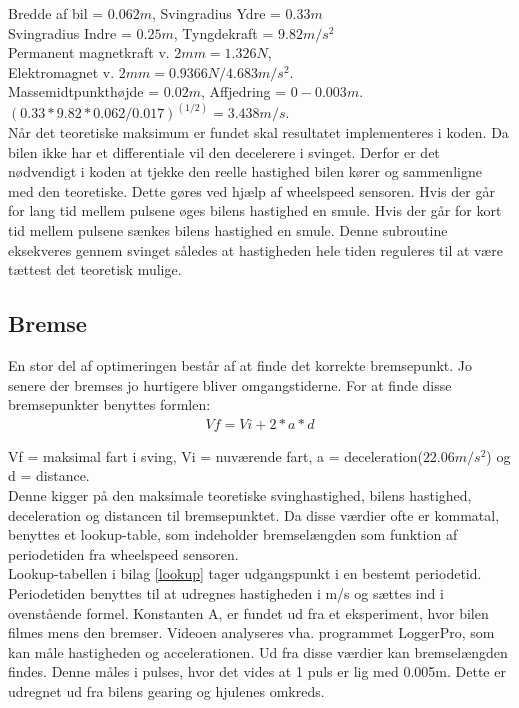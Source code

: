 Bredde af bil = \( 0.062m \), Svingradius Ydre = \( 0.33m \) \\
Svingradius Indre = \( 0.25m \), Tyngdekraft = \( 9.82m/s^2 \) \\
Permanent magnetkraft v. \( 2mm = 1.326N \), \\
Elektromagnet v. \( 2mm = 0.9366N/4.683 m/s^2. \) \\  
Massemidtpunkthøjde = \( 0.02m \), Affjedring = \( 0-0.003m. \) \\
\( (0.33*9.82*0.062/0.017)^(1/2) = 3.438 m/s \). \\


Når det teoretiske maksimum er fundet skal resultatet implementeres i koden. Da bilen ikke har et differentiale vil den decelerere i svinget. Derfor er det nødvendigt i koden at tjekke den reelle hastighed bilen kører og sammenligne med den teoretiske. Dette gøres ved hjælp af wheelspeed sensoren. Hvis der går for lang tid mellem pulsene øges bilens hastighed en smule. Hvis der går for kort tid mellem pulsene sænkes bilens hastighed en smule. Denne subroutine eksekveres gennem svinget således at hastigheden hele tiden reguleres til at være tættest det teoretisk mulige. \\

\subsection{Bremse}

En stor del af optimeringen består af at finde det korrekte bremsepunkt. Jo senere der bremses jo hurtigere bliver omgangstiderne. For at finde disse bremsepunkter benyttes formlen: \\
\begin{align*}
Vf = Vi +2*a*d
\end{align*}

Vf = maksimal fart i sving, Vi = nuværende fart, a = deceleration(\(22.06m/s^2\)) og d = distance. \\


Denne kigger på den maksimale teoretiske svinghastighed, bilens hastighed, deceleration og distancen til bremsepunktet. Da disse værdier ofte er kommatal, benyttes et lookup-table, som indeholder bremselængden som funktion af periodetiden fra wheelspeed sensoren. \\

Lookup-tabellen i bilag \ref{lookup} tager udgangspunkt i en bestemt periodetid. Periodetiden benyttes til at udregnes hastigheden i m/s og sættes ind i ovenstående formel. Konstanten A, er fundet ud fra et eksperiment, hvor bilen filmes mens den bremser. Videoen analyseres vha. programmet LoggerPro, som kan måle hastigheden og accelerationen. Ud fra disse værdier kan bremselængden findes. Denne måles i pulses, hvor det vides at 1 puls er lig med 0.005m. Dette er udregnet ud fra bilens gearing og hjulenes omkreds. \\

